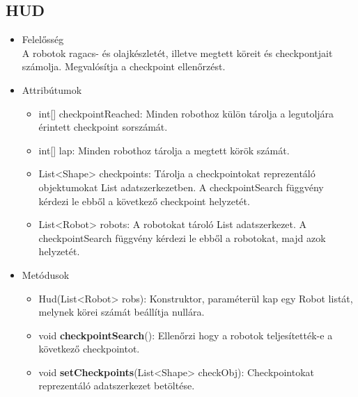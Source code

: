 \subsection{HUD}
\begin{itemize}
\item Felelősség\\
A robotok ragacs- és olajkészletét, illetve megtett köreit és checkpontjait számolja. Megvalósítja a checkpoint ellenőrzést.
\item Attribútumok
	\begin{itemize}
		\item int[] checkpointReached: Minden robothoz külön tárolja a legutoljára érintett checkpoint sorszámát.
		\item int[] lap: Minden robothoz tárolja a megtett körök számát. 
		\item List<Shape> checkpoints: Tárolja a checkpointokat reprezentáló objektumokat List adatszerkezetben. A checkpointSearch függvény kérdezi le ebből a következő checkpoint helyzetét. 
		\item List<Robot> robots: A robotokat tároló List adatszerkezet. A checkpointSearch függvény kérdezi le ebből a robotokat, majd azok helyzetét.
	\end{itemize}
\item Metódusok
	\begin{itemize}
		\item Hud(List<Robot> robs): Konstruktor, paraméterül kap egy Robot listát, melynek körei számát beállítja nullára. 
		\item void \textbf{checkpointSearch}(): Ellenőrzi hogy a robotok teljesítették-e a következő checkpointot.
		\item void \textbf{setCheckpoints}(List<Shape> checkObj): Checkpointokat reprezentáló adatszerkezet betöltése.
		
	\end{itemize}
\end{itemize}

